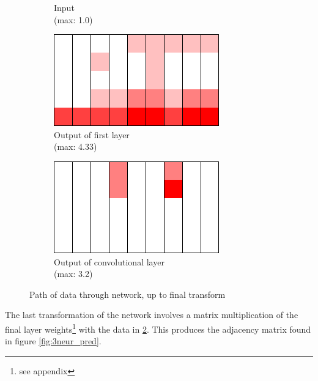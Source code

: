 \begin{figure}[h]
\begin{subfigure}{.15\textwidth}
		\caption{Input\\(max: 1.0)}
		\label{subfig:3neur_in}
	\end{subfigure}
	\hspace{1em}
	\begin{subfigure}{.3\textwidth}
		\includegraphics[width=\textwidth]{fullRun/0_py/layer0/4out.png}
		\caption{Output of first layer\\(max: 4.33)}
	\end{subfigure}
	\hspace{1em}
	\begin{subfigure}{.3\textwidth}
		\includegraphics[width=\textwidth]{fullRun/0_py/layer1/7out.png}
		\caption{Output of convolutional layer\\(max: 3.2)}
		\label{subfig:3neur_out1}
	\end{subfigure}
	\caption{Path of data through network, up to final transform}
	\label{fig:3neur_input}
\end{figure}

The last transformation of the network involves a matrix multiplication of the 
final layer weights\footnote{see appendix} with the data in 
\ref{subfig:3neur_out1}. This produces the adjacency matrix found in figure 
\ref{fig:3neur_pred}.

